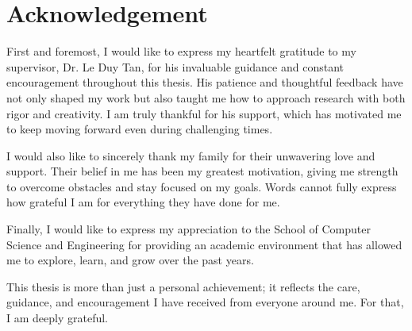 \chapter*{Acknowledgement}

First and foremost, I would like to express my heartfelt gratitude to my supervisor, Dr. Le Duy Tan, for his invaluable guidance and constant encouragement throughout this thesis. His patience and thoughtful feedback have not only shaped my work but also taught me how to approach research with both rigor and creativity. I am truly thankful for his support, which has motivated me to keep moving forward even during challenging times.

I would also like to sincerely thank my family for their unwavering love and support. Their belief in me has been my greatest motivation, giving me strength to overcome obstacles and stay focused on my goals. Words cannot fully express how grateful I am for everything they have done for me.

Finally, I would like to express my appreciation to the School of Computer Science and Engineering for providing an academic environment that has allowed me to explore, learn, and grow over the past years.

This thesis is more than just a personal achievement; it reflects the care, guidance, and encouragement I have received from everyone around me. For that, I am deeply grateful.

